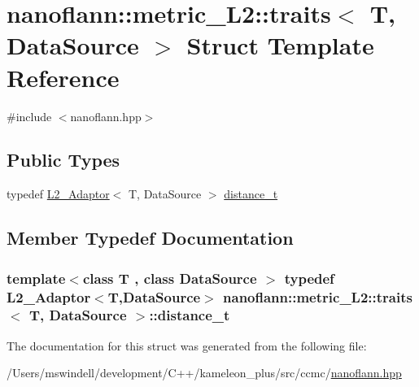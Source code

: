 \hypertarget{structnanoflann_1_1metric___l2_1_1traits}{\section{nanoflann\-:\-:metric\-\_\-\-L2\-:\-:traits$<$ T, Data\-Source $>$ Struct Template Reference}
\label{structnanoflann_1_1metric___l2_1_1traits}
}


{\ttfamily \#include $<$nanoflann.\-hpp$>$}

\subsection*{Public Types}
\begin{DoxyCompactItemize}
\item 
typedef \hyperlink{structnanoflann_1_1_l2___adaptor}{L2\-\_\-\-Adaptor}$<$ T, Data\-Source $>$ \hyperlink{structnanoflann_1_1metric___l2_1_1traits_a80415c5d579219cbf6c3ec33e5f35e79}{distance\-\_\-t}
\end{DoxyCompactItemize}


\subsection{Member Typedef Documentation}
\hypertarget{structnanoflann_1_1metric___l2_1_1traits_a80415c5d579219cbf6c3ec33e5f35e79}{
\subsubsection[{distance\-\_\-t}]{\setlength{\rightskip}{0pt plus 5cm}template$<$class T , class Data\-Source $>$ typedef {\bf L2\-\_\-\-Adaptor}$<$T,Data\-Source$>$ {\bf nanoflann\-::metric\-\_\-\-L2\-::traits}$<$ T, Data\-Source $>$\-::{\bf distance\-\_\-t}}}\label{structnanoflann_1_1metric___l2_1_1traits_a80415c5d579219cbf6c3ec33e5f35e79}


The documentation for this struct was generated from the following file\-:\begin{DoxyCompactItemize}
\item 
/\-Users/mswindell/development/\-C++/kameleon\-\_\-plus/src/ccmc/\hyperlink{nanoflann_8hpp}{nanoflann.\-hpp}\end{DoxyCompactItemize}
